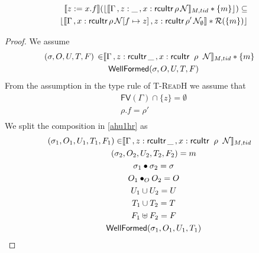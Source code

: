   \begin{lemma}
   \label{lemma:readheap}
\begin{align*}
  \llbracket z:=x.f \rrbracket (\lfloor \llbracket \Gamma\, , z:\_ \, ,  x:\textsf{rcuItr} \, \rho \, \N  \rrbracket_{M,tid} * \{m\}\rfloor)  \subseteq \\
                                                              \lfloor \llbracket \Gamma\,,  x:\textsf{rcuItr} \, \rho \, \N[f\mapsto z]\, ,z:\textsf{rcuItr} \, \rho' \, \N_{\emptyset}  \rrbracket  * \mathcal{R}(\{m\})\rfloor
\end{align*}
 \end{lemma}
 \begin{proof}
We assume
\begin{gather}\label{ahu1hr}
  \begin{aligned}
    (\sigma, O, U, T,F) \, \in &  \llbracket \Gamma\,, z:\textsf{rcuItr}\,\_ \, ,\rcuitrT{x}{G}{k}{k+1}{\_} \rrbracket_{M,tid} * \{m\}
    \end{aligned} \\
\textsf{WellFormed}(\sigma,O,U,T,F)
\label{ahu2hr}
\end{gather}
From the assumption in the type rule of \textsc{T-ReadH} we assume that
\begin{gather}
\textsf{FV}(\Gamma) \cap \{z\}  =\emptyset 
\label{ahu3hr} \\
\rho.f = \rho' 
\label{ahu4hr} \\
\end{gather}
We split the composition in  \ref{ahu1hr} as 
\begin{gather} \label{ahu11hr}
  \begin{aligned}
    (\sigma_1, O_{1}, U_{1}, T_{1} ,F_1) \in & \llbracket  \Gamma\,, z:\textsf{rcuItr}\,\_ \, ,\rcuitrT{x}{G}{k}{k+1}{\_} \rrbracket_{M,tid} \end{aligned}\\
\label{ahu12hr}
(\sigma_2, O_{2}, U_{2}, T_{2},F_2) = m
\\
\label{ahusighr}
\sigma_1 \bullet \sigma_2 = \sigma
\\
\label{ahu13hr}
O_{1} \bullet_{O} O_{2} = O
\\
\label{ahu14hr}
U_{1} \cup U_{2} = U
\\
\label{ahu15hr}
T_{1} \cup T_{2} = T
\\
\label{ahuhrf}
F_1 \uplus F_2 = F
\\
\label{ahu16hr}
\textsf{WellFormed}(\sigma_1,O_{1},U_{1},T_{1})
\\

\end{gather}
\end{proof}
